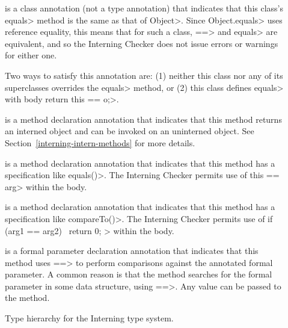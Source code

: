\begin{description}

\item[]
  is a class annotation (not a type annotation) that indicates that this class's
  \<equals> method is the same as that of \<Object>.  Since
  \<Object.equals> uses reference equality, this means that for such a
  class, \<==> and \<equals> are equivalent, and so the Interning Checker
  does not issue errors or warnings for either one.

  Two ways to satisfy this annotation are:  (1) neither this class nor any
  of its superclasses overrides the \<equals> method, or (2) this class
  defines \<equals> with body \<return this == o;>.

\item[]
  is a method declaration annotation that indicates that this method
  returns an interned object and can be invoked
  on an uninterned object. See Section~\ref{interning-intern-methods} for more details.

\item[]
  is a method declaration annotation that indicates that this method
  has a specification like \<equals()>.  The Interning Checker permits use
  of \<this == arg> within the body.

\item[]
  is a method declaration annotation that indicates that this method
  has a specification like \<compareTo()>.  The Interning Checker permits use
  of \<if (arg1 == arg2) \ttlcb\ return 0; \ttrcb> within the body.

\item[]
  is a formal parameter declaration annotation that indicates that this
  method uses \<==> to perform comparisons against the annotated formal
  parameter.  A common reason is that the method searches for the formal
  parameter in some data structure, using \<==>.  Any value
  can be passed to the method.
\end{description}


\begin{figure}
\caption{Type hierarchy for the Interning type system.}
\label{fig-interning-hierarchy}
\end{figure}

